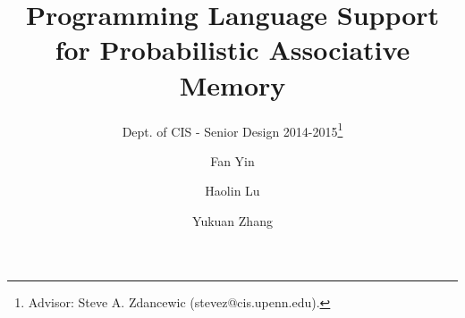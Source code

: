 \documentclass{sig-alternate}
\begin{document}
 

\title{Programming Language Support for Probabilistic Associative Memory}
\subtitle{Dept. of CIS - Senior Design 2014-2015\thanks{Advisor: Steve A. Zdancewic (stevez@cis.upenn.edu).}}
\author{
    Fan Yin \\ 
    \and Haolin Lu \\ 
    \and Yukuan Zhang\\ 
}
%
%
\date{}
\maketitle
\end{document}
